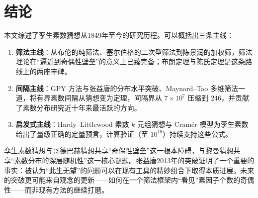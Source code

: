 \section{结论}\label{sec:conclusion}

本文综述了孪生素数猜想从1849年至今的研究历程。可以概括出三条主线：

\begin{enumerate}[label=(\arabic*)]
    \item \textbf{筛法主线}：从布伦的纯筛法、塞尔伯格的二次型筛法到陈景润的加权筛，筛法理论在“逼近到奇偶性壁垒”的意义上已臻完备；布朗定理与陈氏定理是这条路线上的两座丰碑。
    \item \textbf{间隔主线}：GPY 方法与张益唐的分布水平突破、Maynard--Tao 多维筛法一道，将有界素数间隔从猜想变为定理，间隔界从 $7 \times 10^7$ 压缩到 $246$，并贡献了素数分布研究近十年来最活跃的方向。
    \item \textbf{启发式主线}：Hardy--Littlewood 素数 $k$ 元组猜想与 Cram\'er 模型为孪生素数给出了量级正确的定量预言，计算验证（至 $10^{19}$）持续支持这些公式。
\end{enumerate}

孪生素数猜想与哥德巴赫猜想共享“奇偶性壁垒”这一根本障碍，与黎曼猜想共享“素数分布的深层随机性”这一核心谜题。张益唐2013年的突破证明了一个重要的事实：被认为“此生无望”的问题可以在现有工具的精妙组合下取得本质进展。未来的突破更可能来自观念的更新——如何在一个筛法框架内“看见”素因子个数的奇偶性——而非现有方法的继续打磨。
